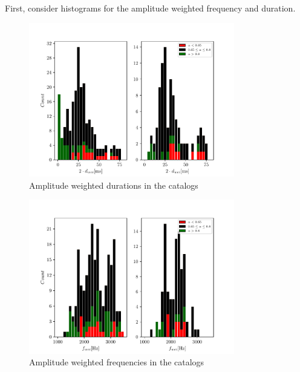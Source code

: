First, consider histograms for the amplitude weighted frequency and duration.

\begin{figure}[hbt!]
\begin{center}
\includegraphics[width=0.8\textwidth, angle=0]{images/Data_analysis/results/alpha_dhist.pdf}
\caption{Amplitude weighted durations in the catalogs}
\label{adhist}
\end{center}
\end{figure}

\begin{figure}[hbt!]
\begin{center}
\includegraphics[width=0.8\textwidth, angle=0]{images/Data_analysis/results/alpha_fhist.pdf}
\caption{Amplitude weighted frequencies in the catalogs}
\label{afhist}
\end{center}
\end{figure}
\FloatBarrier


